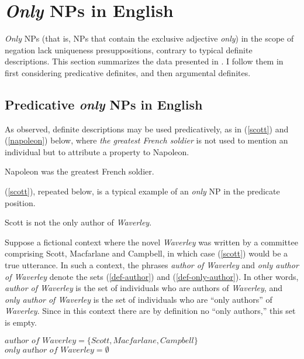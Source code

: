 \section{\textit{Only} NPs in English \label{sec:anti-uniqueness-english}}

\textit{Only} NPs (that is, NPs that contain the exclusive adjective \textit{only}) in the scope of negation lack uniqueness presuppositions, contrary to typical definite descriptions. This section summarizes the data presented in \citet{cb2012b, cb2015}. I follow them in first considering predicative definites, and then argumental definites.

\subsection{Predicative \textit{only} NPs in English}
As \citet{strawson50} observed, definite descriptions may be used predicatively, as in (\ref{scott}) and (\ref{napoleon}) below, where \textit{the greatest French soldier} is not used to mention an individual but to attribute a property to Napoleon.

\begin{exe}
	\ex \label{napoleon} Napoleon was the greatest French soldier.
\end{exe}

(\ref{scott}), repeated below, is a typical example of an \textit{only} NP in the predicate position.

\begin{exe}
	 Scott is not the only author of \textit{Waverley}.
\end{exe}

Suppose a fictional context where the novel \textit{Waverley} was written by a committee comprising Scott, Macfarlane and Campbell, in which case (\ref{scott}) would be a true utterance. In such a context, the phrases \textit{author of Waverley} and \textit{only author of Waverley} denote the sets (\ref{def-author}) and (\ref{def-only-author}). In other words, \textit{author of Waverley} is the set of individuals who are authors of \textit{Waverley}, and \textit{only author of Waverley} is the set of individuals who are ``only authors'' of \textit{Waverley}. Since in this context there are by definition no ``only authors,'' this set is empty.

\begin{exe}
	\ex \label{def-author} $\textit{author of Waverley} = \lbrace Scott, Macfarlane, Campbell \rbrace$
	\ex \label{def-only-author} $\textit{only author of Waverley} = \emptyset$
\end{exe}

